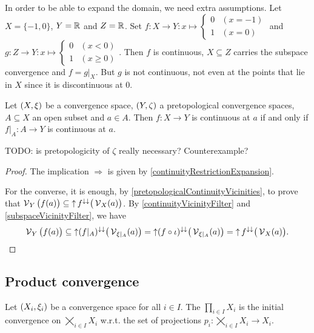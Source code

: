 \begin{example}
In order to be able to expand the domain, we need extra assumptions. Let $X = \{-1,0\}$, $Y = \mathbb{R}$ and $Z = \mathbb{R}$. Set $f: X\to Y: x\mapsto \begin{cases}
0 & (x=-1) \\ 1 & (x = 0)
\end{cases}$ and $g: Z\to Y: x\mapsto \begin{cases}
0 & (x < 0) \\
1 & (x \geq 0)
\end{cases}$. Then $f$ is continuous, $X \subseteq Z$ carries the subspace convergence and $f = g|_X$. But $g$ is not continuous, not even at the points that lie in $X$ since it is discontinuous at $0$.
\end{example}

\begin{proposition} \label{continuityExpandedDomain}
Let $\sSet{X,\xi}$ be a convergence space, $\sSet{Y,\zeta}$ a pretopological convergence spaces, $A\subseteq X$ an open subset and $a\in A$. Then $f: X\to Y$ is continuous at $a$ \textup{if and only if} $f|_A: A\to Y$ is continuous at $a$.
\end{proposition}
TODO: is pretopologicity of $\zeta$ really necessary? Counterexample?
\begin{proof}
The implication $\Rightarrow$ is given by \ref{continuityRestrictionExpansion}.

For the converse, it is enough, by \ref{pretopologicalContinuityVicinities}, to prove that $\operatorname{\mathcal{V}}_Y\big(f(a)\big) \subseteq \operatorname{\uparrow} f^{\downarrow\downarrow}\big(\operatorname{\mathcal{V}}_{X}(a)\big)$.
By \ref{continuityVicinityFilter} and \ref{subspaceVicinityFilter}, we have
\[ \operatorname{\mathcal{V}}_Y\big(f(a)\big) \subseteq \operatorname{\uparrow} (f|_A)^{\downarrow\downarrow}\big(\operatorname{\mathcal{V}}_{\xi|_A}(a)\big) = \operatorname{\uparrow} (f\circ \iota)^{\downarrow\downarrow}\big(\operatorname{\mathcal{V}}_{\xi|_A}(a)\big) = \operatorname{\uparrow} f^{\downarrow\downarrow}\big(\operatorname{\mathcal{V}}_{X}(a)\big). \]
\end{proof}

\subsection{Product convergence}
\begin{definition}
Let $\sSet{X_i, \xi_i}$ be a convergence space for all $i\in I$. The  $\prod_{i\in I}X_i$ is the initial convergence on $\bigtimes_{i\in I}X_i$ w.r.t. the set of projections $p_i: \bigtimes_{i\in I}X_i \to X_i$.
\end{definition}

